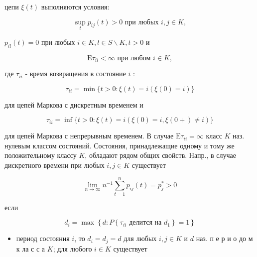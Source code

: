 \documentclass[10pt]{article}
\begin{document}
цепи $\xi(t)$ выполняются условия:



\[

\sup _{t} p_{i j}(t)>0 \text { при любых } i, j \in K,

\]



$p_{i l}(t)=0$ при любых $i \in K, l \in S \backslash K, t>0$ и



\[

\mathrm{E} \tau_{i i}<\infty \text { при любом } i \in K,

\]



где $\tau_{i i}$ - время возвращения в состояние $i$ :



\[

\tau_{i i}=\min \{t>0: \xi(t)=i(\xi(0)=i)\}

\]



для цепей Маркова с дискретным временем и



\[

\tau_{i i}=\inf \{t>0: \xi(t)=i(\xi(0)=i, \xi(0+) \neq i)\}

\]



для цепей Маркова с непрерывным временем. В случае $\mathrm{E} \tau_{i i}=\infty$ класс $K$ наз. нулевым классом состояний. Состояния, принадлежащие одному и тому же положительному классу $K$, обладают рядом общих свойств. Напр., в случае дискретного времени при любых $i, j \in K$ существует



\[

\lim _{n \rightarrow \infty} n^{-1} \sum_{t=1}^{n} p_{i j}(t)=p_{j}^{*}>0

\]



если



\[

d_{i}=\max \left\{d: P\left\{\tau_{i i} \text { делится на } d_{1}\right\}=1\right\}

\]



\begin{itemize}

  \item период состояния $i$, то $d_{i}=d_{j}=d$ для любых $i, j \in K$ и $d$ наз. п е р и о до м к ла с с а $K$; для любого $i \in K$ существует

\end{itemize}
\end{document}
